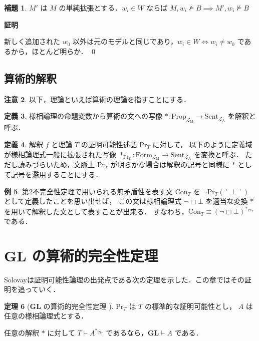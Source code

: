 \documentclass{jsarticle}
\makeatletter
\newcommand*{\Lang}[1]{\mathcal{L}_\mathrm{#1}}
\newcommand*{\LangA}{\Lang{A}}
\newcommand*{\LangM}{\Lang{M}}
\newcommand*{\Logic}[1]{\mathbf{#1}}
\newcommand*{\LogicGL}{\Logic{GL}}
\newcommand*{\Prop}{\mathrm{Prop}}
\newcommand*{\Form}{\mathrm{Form}}
\newcommand*{\Sent}{\mathrm{Sent}}
\newcommand*{\Provable}{\mathrm{Pr}}
\theoremstyle{definition}
\newtheorem{theorem}{定理}[section]
\newtheorem{lemma}[theorem]{補題}
\newtheorem{definition}[theorem]{定義}
\newtheorem{remark}[theorem]{注意}
\newtheorem{example}[theorem]{例}
\renewcommand{\proofname}{証明}
\renewenvironment{proof}[1][\proofname]{\par
    \normalfont 
    \topsep6\p@\@plus6\p@\relax
    \trivlist
    \item\relax
    {\bfseries\gtfamily
    #1\@addpunct{.}}\hspace\labelsep\ignorespaces
    }{%
    \endtrivlist
    \@endpefalse
}
\makeatother
\begin{document}
\begin{lemma}\label{lem:simple_extension}
    $M'$ は $M$ の単純拡張とする．$w_i \in W$ ならば $M,w_i \nvDash B \implies M',w_i \nvDash B$
\end{lemma}
\begin{proof}
    新しく追加された $w_0$ 以外は元のモデルと同じであり，$w_i \in W \iff w_i \neq w_0$ であるから，ほとんど明らか．
    \qed
\end{proof}

\subsection{算術的解釈}

\begin{remark}
    以下，理論といえば算術の理論を指すことにする．
\end{remark}

\begin{definition}
    様相論理の命題変数から算術の文への写像 $* \colon \Prop_{\LangM} \to \Sent_{\LangA}$ を解釈と呼ぶ．
\end{definition}

\begin{definition}
    解釈 $f$ と理論 $T$ の証明可能性述語 $\Provable_T$ に対して，
    以下のように定義域が様相論理式一般に拡張された写像 $*_{\Provable_T} \colon \Form_{\LangM} \to \Sent_{\LangA}$ を変換と呼ぶ．
    ただし読みづらいため，文脈上 $\Provable_T$ が明らかな場合は解釈の記号と同様に $*$ として記号を濫用することにする．
\end{definition}

\begin{example}
    第2不完全性定理で用いられる無矛盾性を表す文 $\mathrm{Con}_T$ を $\lnot \Provable_T(\ulcorner \bot \urcorner)$ として定義したことを思い出せば，
    この文は様相論理式 $\lnot \Box \bot$ を適当な変換 $*$ を用いて解釈した文として表すことが出来る．
    すなわち，$\mathrm{Con}_T \equiv (\lnot \Box \bot)^{*_{\Provable_T}}$ である．
\end{example}



\section{$\LogicGL$ の算術的完全性定理}

Solovay\cite{solovay_provability_1976}は証明可能性論理の出発点である次の定理を示した．この章ではその証明を追っていく．

\begin{theorem}[$\LogicGL$ の算術的完全性定理 \cite*{solovay_provability_1976}]\label{thm:GL_arith_completeness}
    $\Provable_T$ は $T$ の標準的な証明可能性とし，
    $A$ は任意の様相論理式とする．

    任意の解釈 $*$ に対して $T \vdash A^{*_{\Provable_T}}$ であるなら，$\LogicGL \vdash A$ である．
\end{theorem}
\end{document}
